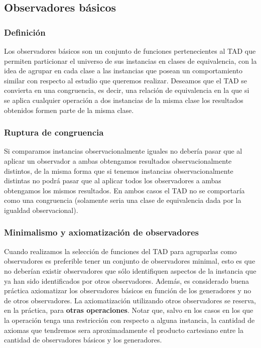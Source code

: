\documentclass[10pt, a4paper]{report}
\begin{document}
\subsection{Observadores b\'asicos}

\subsubsection*{Definici\'on}
Los observadores b\'asicos son un conjunto de funciones pertenecientes al TAD que permiten particionar el universo de sus instancias en clases de equivalencia, con la idea de agrupar en cada clase a las instancias que posean un comportamiento similar con respecto al estudio que queremos realizar. Deseamos que el TAD se convierta en una congruencia, es decir, una relaci\'on de equivalencia en la que si se aplica cualquier operaci\'on a dos instancias de la misma clase los resultados obtenidos formen parte de la misma clase.

\subsubsection*{Ruptura de congruencia}
Si comparamos instancias observacionalmente iguales no deber\'ia pasar que al aplicar un observador a ambas obtengamos resultados observacionalmente distintos, de la misma forma que si tenemos instancias observacionalmente distintas no podr\'a pasar que al aplicar todos los observadores a ambas obtengamos los mismos resultados. En ambos casos el TAD no se comportar\'ia como una congruencia (solamente seria una clase de equivalencia dada por la igualdad observacional).

\subsubsection*{Minimalismo y axiomatizaci\'on de observadores}
Cuando realizamos la selecci\'on de funciones del TAD para agruparlas como observadores es preferible tener un conjunto de observadores minimal, esto es que no deber\'ian existir observadores que s\'olo identifiquen aspectos de la instancia que ya han sido identificados por otros observadores. Adem\'as, es considerado buena pr\'actica axiomatizar los observadores b\'asicos en funci\'on de los generadores y no de otros observadores. La axiomatizaci\'on utilizando otros observadores se reserva, en la pr\'actica, para \textbf{otras operaciones}. Notar que, salvo en los casos en los que la operaci\'on tenga una restricci\'on con respecto a alguna instancia, la cantidad de axiomas que tendremos sera aproximadamente el producto cartesiano entre la cantidad de observadores b\'asicos y los generadores.
\end{document}
